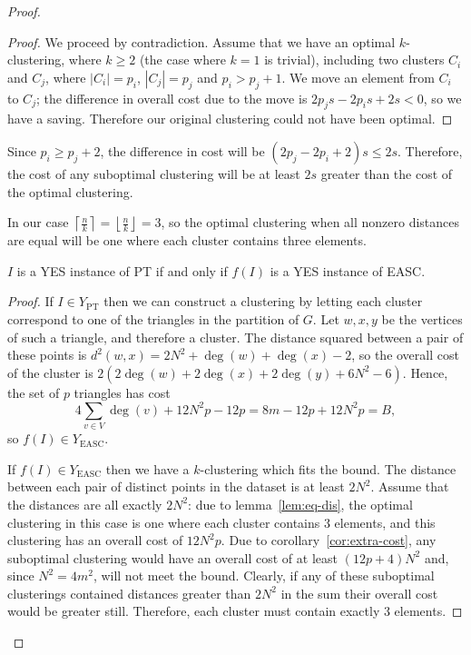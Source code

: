 \begin{proof}
\begin{proof}
    We proceed by contradiction.  Assume that we have an optimal
    $k$-clustering, where $k \geq 2$ (the case where $k=1$ is trivial),
    including two clusters $C_i$ and $C_j$, where $|C_i| = p_i$, $|C_j| = p_j$
    and $p_i > p_j + 1$.  We move an element from $C_i$ to $C_j$; the
    difference in overall cost due to the move is $2p_js - 2p_is + 2s < 0$, so
    we have a saving.  Therefore our original clustering could not have been
    optimal.
  \end{proof}

  \begin{cor}
    \label{cor:extra-cost}
    Since $p_i \geq p_j + 2$, the difference in cost will be $(2p_j - 2p_i +
    2)s \leq 2s$.  Therefore, the cost of any suboptimal clustering will be at
    least $2s$ greater than the cost of the optimal clustering.
  \end{cor}

  In our case $\left\lceil \frac{n}{k} \right\rceil = \left\lfloor \frac{n}{k}
  \right\rfloor = 3$, so the optimal clustering when all nonzero distances are
  equal will be one where each cluster contains three elements.

  \begin{lem}
    \label{lem:euclidean-iff}
    $I$ is a YES instance of PT if and only if $f(I)$ is a YES instance of EASC.
  \end{lem}

  \begin{proof}
    If $I \in Y_{\text{PT}}$ then we can construct a clustering by letting
    each cluster correspond to one of the triangles in the partition of $G$.
    Let $w,x,y$ be the vertices of such a triangle, and therefore a cluster.
    The distance squared between a pair of these points is $d^2(w,x) =
    2N^2+\deg(w)+\deg(x)-2$, so the overall cost of the cluster is
    $2(2\deg(w)+2\deg(x)+2\deg(y)+6N^2-6)$.  Hence, the set of $p$ triangles
    has cost
    \begin{equation}
      \label{eq:tri-cost}
      4\sum_{v \in V} \deg(v) + 12N^2p - 12p = 8m - 12p + 12N^2p = B,
    \end{equation}
    so $f(I) \in Y_{\text{EASC}}$.

    If $f(I) \in Y_{\text{EASC}}$ then we have a $k$-clustering which fits the
    bound.  The distance between each pair of distinct points in the dataset
    is at least $2N^2$.  Assume that the distances are all exactly $2N^2$: due
    to lemma~\ref{lem:eq-dis}, the optimal clustering in this case is one
    where each cluster contains 3 elements, and this clustering has an overall
    cost of $12N^2p$.  Due to corollary~\ref{cor:extra-cost}, any suboptimal
    clustering would have an overall cost of at least $(12p+4)N^2$ and, since
    $N^2=4m^2$, will not meet the bound.  Clearly, if any of these suboptimal
    clusterings contained distances greater than $2N^2$ in the sum their
    overall cost would be greater still.  Therefore, each cluster must contain
    exactly 3 elements.


\end{proof}
\end{proof}
